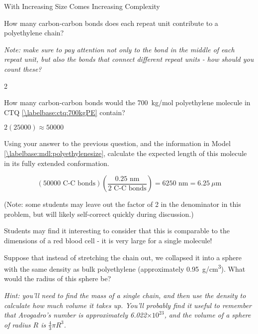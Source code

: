 \begin{activity}{With Increasing Size Comes Increasing Complexity}
\begin{ctqs}

	\question How many carbon-carbon bonds does each repeat unit contribute to a polyethylene chain?
	
		\emph{Note: make sure to pay attention not only to the bond in the middle of each repeat unit, but also the bonds that connect different repeat units - how should you count these?}
		
		\begin{solution}[1in]
			2
		\end{solution}
	
	\question How many carbon-carbon bonds would the 700~kg/mol polyethylene molecule in CTQ \ref{\labelbase:ctq:700kgPE} contain?
		
		\begin{solution}[1in]
			$2(25000)\approx 50000$
		\end{solution}
	
	\question Using your answer to the previous question, and the information in Model \ref{\labelbase:mdl:polyethylenesize}, calculate the expected length of this molecule in its fully extended conformation. \label{\labelbase:ctq:extendedPE}
		
		\begin{solution}[1.9in]
			\begin{equation*}
				\left(50000\text{ C-C bonds}\right)\left(\frac{0.25\text{ nm}}{2\text{ C-C bonds}}\right) = 6250\text{ nm} = 6.25~\mu\text{m}
			\end{equation*}
			
			(Note: some students may leave out the factor of 2 in the denominator in this problem, but will likely self-correct quickly during discussion.)
			
			Students may find it interesting to consider that this is comparable to the dimensions of a red blood cell - it is very large for a single molecule!
		\end{solution}
	\question Suppose that instead of stretching the chain out, we collapsed it into a sphere with the same density as bulk polyethylene (approximately 0.95~g/cm\textsuperscript{3}).  What would the radius of this sphere be? \label{\labelbase:ctq:collapsedPE}
	
		\emph{Hint: you'll need to find the mass of a single chain, and then use the density to calculate how much volume it takes up.  You'll probably find it useful to remember that Avogadro's number is approximately 6.022$\times 10^{23}$, and the volume of a sphere of radius $R$ is $\frac{4}{3}\pi R^3$.}
		

\end{ctqs}
\end{activity}
